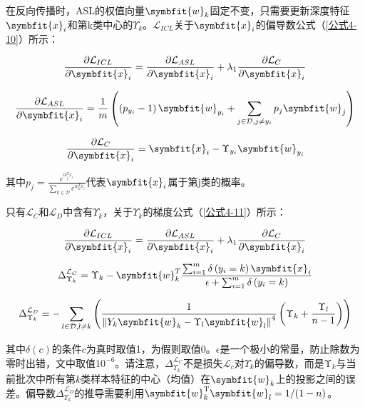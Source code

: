 在反向传播时，ASL的权值向量$\symbfit{w}_k$固定不变，只需要更新深度特征$\symbfit{x}_i$和第k类中心的$\Upsilon_k$。$\mathcal{L}_{ICL}$关于$\symbfit{x}_i$的偏导数公式（\ref{公式4-10}）所示：

\begin{equation}\label{公式4-10}
	\frac{\partial\mathcal{L}_{ICL}}{\partial\symbfit{x}_i}=\frac{\partial\mathcal{L}_{ASL}}{\partial\symbfit{x}_i}+\lambda_1\frac{\partial\mathcal{L}_C}{\partial\symbfit{x}_i}
\end{equation}

$$
\frac{\partial \mathcal{L}_{A S L}}{\partial \symbfit{x}_{i}}=\frac{1}{m}\left(\left(p_{y_{i}}-1\right) \symbfit{w}_{y_{i}}+\sum_{j \in \mathcal{D}, j \neq y_{i}} p_{j} \symbfit{w}_{j}\right)
$$

$$
\frac{\partial \mathcal{L}_{C}}{\partial \symbfit{x}_{i}}=\symbfit{x}_{i}-\Upsilon_{y_{i}} \symbfit{w}_{y_{i}}
$$

其中$p_{j}=\frac{e^{w_{j}^{T} x_{i}}}{\sum_{k \in \mathcal{D}} e^{w_{k}^{T} x_{i}}}$代表$\symbfit{x}_i$属于第j类的概率。

只有$\mathcal{L}_C$和$\mathcal{L}_D$中含有$\Upsilon_k$，关于$\Upsilon_k$的梯度公式（\ref{公式4-11}）所示：

\begin{equation}\label{公式4-11}
	\frac{\partial\mathcal{L}_{ICL}}{\partial\symbfit{x}_i}=\frac{\partial\mathcal{L}_{ASL}}{\partial\symbfit{x}_i}+\lambda_1\frac{\partial\mathcal{L}_C}{\partial\symbfit{x}_i}
\end{equation}

$$
\Delta_{\Upsilon_{k}}^{\mathcal{L}_{C}}=\Upsilon_{k}-\symbfit{w}_{k}^{T} \frac{\sum_{i=1}^{m} \delta\left(y_{i}=k\right) \symbfit{x}_{i}}{\epsilon+\sum_{i=1}^{m} \delta\left(y_{i}=k\right)}
$$

$$
\Delta_{\Upsilon_{k}}^{\mathcal{L}_{D}}=-\sum_{l \in \mathcal{D}, l \neq k}\left(\frac{1}{\left\|Y_{k} \symbfit{w}_{k}-\Upsilon_{l} \symbfit{w}_{l}\right\|^{4}}\left(\Upsilon_{k}+\frac{\Upsilon_{l}}{n-1}\right)\right)
$$

其中$\delta\left(c\right)$的条件$c$为真时取值1，为假则取值0。$\epsilon$是一个极小的常量，防止除数为零时出错，文中取值${10}^{-6}$。请注意，$\Delta_{\Upsilon_{k}}^{\mathcal{L}_{C}}$不是损失$\mathcal{L}_c$对$\Upsilon_k$的偏导数，而是$\mathrm{\Upsilon}_k$与当前批次中所有第$k$类样本特征的中心（均值）在$\symbfit{w}_k$上的投影之间的误差。偏导数$\Delta_{\Upsilon_{k}}^{\mathcal{L}_{D}}$的推导需要利用$\symbfit{w}_{k}^{\mathrm{T}} \symbfit{w}_{l}=1 / (1-n)$。

